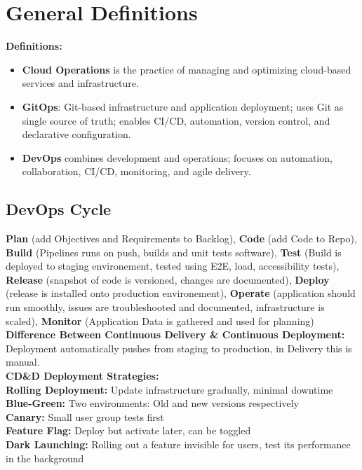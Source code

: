 \section{General Definitions}
\textbf{Definitions:}
\begin{itemize}

	\item \textbf{Cloud Operations} is the practice of managing and optimizing cloud-based services and infrastructure.
	\item \textbf{GitOps}: Git-based infrastructure and application deployment; uses Git as single source of truth; enables CI/CD, automation, version control, and declarative configuration.

	\item \textbf{DevOps} combines development and operations; focuses on automation, collaboration, CI/CD, monitoring, and agile delivery.
\end{itemize}
\subsection{DevOps Cycle}
\textbf{Plan} (add Objectives and Requirements to Backlog), \textbf{Code} (add Code to Repo), \textbf{Build} (Pipelines runs on push, builds and unit tests software), \textbf{Test} (Build is deployed to staging environement, tested using E2E, load, accessibility tests), \textbf{Release} (snapshot of code is versioned, changes are documented), \textbf{Deploy} (release is installed onto production environement), \textbf{Operate} (application should run smoothly, issues are troubleshooted and documented, infrastructure is scaled), \textbf{Monitor} (Application Data is gathered and used for planning) \\
\textbf{Difference Between Continuous Delivery \& Continuous Deployment:} Deployment automatically pushes from staging to production, in Delivery this is manual. \\
\textbf{CD\&D Deployment Strategies:} \\
\textbf{Rolling Deployment:} Update infrastructure gradually, minimal downtime \\
\textbf{Blue-Green:} Two environments: Old and new versions respectively \\
\textbf{Canary:} Small user group tests first \\
\textbf{Feature Flag:} Deploy but activate later, can be toggled \\
\textbf{Dark Launching:} Rolling out a feature invisible for users, test its performance in the background
